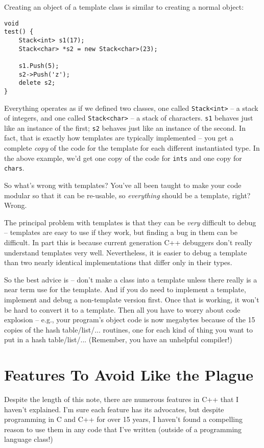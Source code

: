 Creating an object of a template class is similar to creating
a normal object:

\begin{verbatim}
void
test() {
    Stack<int> s1(17);
    Stack<char> *s2 = new Stack<char>(23);

    s1.Push(5);
    s2->Push('z');
    delete s2;
}
\end{verbatim}

Everything operates as if we defined two classes, one
called {\tt Stack<int>} -- a stack of integers, and one
called {\tt Stack<char>} -- a stack of characters.
{\tt s1} behaves just like an instance of the first;
{\tt s2} behaves just like an instance of the second.
In fact, that is exactly how templates are typically implemented --
you get a complete {\em copy} of the code for the template
for each different instantiated type. In the above example,
we'd get one copy of the code for {\tt ints} and one copy for {\tt chars}.

So what's wrong with templates?  You've all been taught to make
your code modular so that it can be re-usable, so {\em everything}
should be a template, right?  Wrong.  

The principal problem with templates is that they can be {\em very} 
difficult to debug -- templates are easy to use if they work, but 
finding a bug in them can be difficult. In part this is because 
current generation C++ debuggers don't really understand templates 
very well.  Nevertheless, it is easier to debug a template than
two nearly identical implementations that differ only in their types.

So the best advice is -- don't make a class into a template
unless there really is a near term use for the template. And if you
do need to implement a template, implement and debug a non-template
version first.  Once that is working, it won't be hard to convert
it to a template.  Then all you have to worry about code
explosion -- e.g., your program's object code is now megabytes
because of the 15 copies of the hash table/list/... routines, one for 
each kind of thing you want to put in a hash table/list/...
(Remember, you have an unhelpful compiler!)

\section{Features To Avoid Like the Plague}

Despite the length of this note, there are numerous
features in C++ that I haven't explained.  I'm sure each feature
has its advocates, but despite programming in C and C++ for over 15 
years, I haven't found a compelling reason to use them in any code
that I've written (outside of a programming language class!) 

